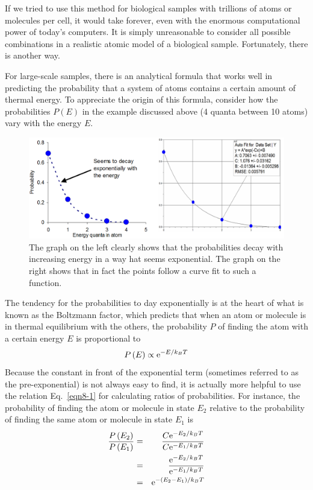 If we tried to use this method for biological samples with trillions of atoms or molecules per cell, it would take forever, even with the enormous computational power of today’s computers.  It is simply unreasonable to consider all possible combinations in a realistic atomic model of a biological sample.  Fortunately, there is another way.

For large-scale samples, there is an analytical formula that works well in predicting the probability that a system of atoms contains a certain amount of thermal energy.  To appreciate the origin of this formula, consider how the probabilities $P(E)$ in the example discussed above (4 quanta between 10 atoms) vary with the energy $E$. 
\begin{figure}[htb]
	\centering
	\includegraphics[width=\textwidth]{./figures/Topic8/Fig8-1.png}
	\caption{The graph on the left clearly shows that the probabilities decay with increasing energy in a way hat seems exponential. The graph on the right shows that in fact the points follow a curve fit to such a function.}
 	\label{Fig8-1}
\end{figure}
The tendency for the probabilities to day exponentially is at the heart of what is known as the Boltzmann factor, which predicts that when an atom or molecule is in thermal equilibrium with the others, the probability $P$ of finding the atom with a certain energy $E$ is proportional to
\begin{equation}\label{eqn8-1}
P\left(E\right)\propto{\rm e}^{-E/k_BT}
\end{equation}
Because the constant in front of the exponential term (sometimes referred to as the pre-exponential) is not always easy to find, it is actually more helpful to use the relation Eq.~\ref{eqn8-1} for calculating ratios of probabilities.  For instance, the probability of finding the atom or molecule in state $E_2$ relative to the probability of finding the same atom or molecule in state $E_1$ is
\begin{eqnarray}\label{eqn8-2}
\frac{P\left(E_2\right)}{P\left(E_1\right)} &=& \frac{C{\rm e}^{-E_2/k_BT}}{C{\rm e}^{-E_1/k_BT}}\nonumber\\
&=& \frac{{\rm e}^{-E_2/k_BT}}{{\rm e}^{-E_1/k_BT}}\nonumber\\
&=& {\rm e}^{-\left(E_2-E_1\right)/k_BT}
\end{eqnarray}

